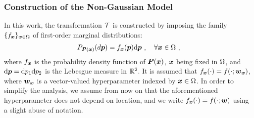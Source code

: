 \subsubsection{Construction of the Non-Gaussian Model}
In this work, the transformation $\mathcal{T}$ is constructed by imposing the family $\{f_{\boldsymbol{x}}\}_{\boldsymbol{x}\in\Omega}$ of first-order marginal distributions:
\begin{align}
  P_{\boldsymbol{P}(\boldsymbol{x})}(d\boldsymbol{p}) = f_{\boldsymbol{x}}(\boldsymbol{p})\mathrm{d}\boldsymbol{p}~, \quad \forall \boldsymbol{x} \in \Omega~,
\end{align}
where $f_{\boldsymbol{x}}$ is the probability density function of $\boldsymbol{P}(\boldsymbol{x})$, $\boldsymbol{x}$ being fixed in $\Omega$, and $\mathrm{d}\boldsymbol{p}=\mathrm{d}p_1\mathrm{d}p_2$ is the Lebesgue measure in $\mathbb{R}^2$. It is assumed that $f_{\boldsymbol{x}}(\cdot) = f(\cdot; \boldsymbol{w}_{\boldsymbol{x}})$, where $\boldsymbol{w}_{\boldsymbol{x}}$ is a vector-valued hyperparameter indexed by $\boldsymbol{x} \in \Omega$. In order to simplify the analysis, we assume from now on that the aforementioned hyperparameter does not depend on location, and we write $f_{\boldsymbol{x}}(\cdot) = f(\cdot; \boldsymbol{w})$ using a slight abuse of notation.


